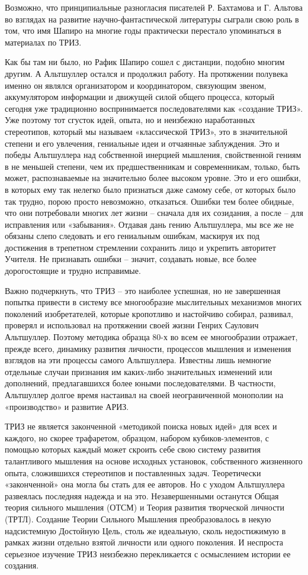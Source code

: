\documentclass[11pt,a4paper]{article}
\begin{document}
Возможно, что принципиальные разногласия писателей Р. Бахтамова и Г. Альтова
во взглядах на развитие научно-фантастической литературы сыграли свою роль в
том, что имя Шапиро на многие годы практически перестало упоминаться в
материалах по ТРИЗ.

Как бы там ни было, но Рафик Шапиро сошел с дистанции, подобно многим
другим. А Альтшуллер остался и продолжил работу. На протяжении полувека именно
он являлся организатором и координатором, связующим звеном, аккумулятором
информации и движущей силой общего процесса, который сегодня уже традиционно
воспринимается последователями как «создание ТРИЗ». Уже поэтому тот сгусток
идей, опыта, но и неизбежно наработанных стереотипов, который мы называем
«классической ТРИЗ», это в значительной степени и его увлечения, гениальные
идеи и отчаянные заблуждения. Это и победы Альтшуллера над собственной
инерцией мышления, свойственной гениям в не меньшей степени, чем их
предшественникам и современникам, только, быть может, распознаваемые на
значительно более высоком уровне. Это и его ошибки, в которых ему так нелегко
было признаться даже самому себе, от которых было так трудно, порою просто
невозможно, отказаться. Ошибки тем более обидные, что они потребовали многих
лет жизни -- сначала для их созидания, а после -- для исправления или
«забывания». Отдавая дань гению Альтшуллера, мы все же не обязаны слепо
следовать и его гениальным ошибкам, маскируя их под достижения в трепетном
стремлении сохранить лицо и укрепить авторитет Учителя. Не признавать ошибки
-- значит, создавать новые, все более дорогостоящие и трудно исправимые.

Важно подчеркнуть, что ТРИЗ -- это наиболее успешная, но не завершенная
попытка привести в систему все многообразие мыслительных механизмов многих
поколений изобретателей, которые кропотливо и настойчиво собирал, развивал,
проверял и использовал на протяжении своей жизни Генрих Саулович
Альтшуллер. Поэтому методика образца 80-х во всем ее многообразии отражает,
прежде всего, динамику развития личности, процессов мышления и изменения
взглядов на эти процессы самого Альтшуллера. Известны лишь немногие отдельные
случаи признания им каких-либо значительных изменений или дополнений,
предлагавшихся более юными последователями. В частности, Альтшуллер долгое
время настаивал на своей неограниченной монополии на «производство» и развитие
АРИЗ.

ТРИЗ не является законченной «методикой поиска новых идей» для всех и каждого,
но скорее трафаретом, образцом, набором кубиков-элементов, с помощью которых
каждый может скроить себе свою систему развития талантливого мышления на
основе исходных установок, собственного жизненного опыта, сложившихся
стереотипов и поставленных задач. Теоретически «законченной» она могла бы
стать для ее авторов. Но с уходом Альтшуллера развеялась последняя надежда и
на это. Незавершенными останутся Общая теория сильного мышления (ОТСМ) и
Теория развития творческой личности (ТРТЛ). Создание Теории Сильного Мышления
преобразовалось в некую надсистемную Достойную Цель, столь же идеальную, сколь
недостижимую в рамках жизни отдельно взятой личности или одного поколения. И
неспроста серьезное изучение ТРИЗ неизбежно перекликается с осмыслением
истории ее создания.
\end{document}
